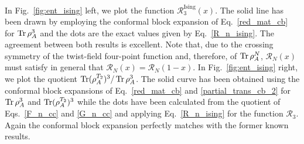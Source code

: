\documentclass[a4paper,11pt]{article}
\def\Tr{\mathop{\mbox{\normalfont Tr}}\nolimits}
\begin{document}
In Fig.~\ref{fig:ent_ising} left, we plot the function $\mathcal{R}_3^{\text{Ising}}(x)$. 
The solid line has been drawn by employing the conformal block expansion of Eq.~\eqref{red_mat_cb} 
for $\Tr\rho_A^3$ and the dots are the exact values given by Eq.~\eqref{R_n_ising}. 
The agreement between both results is excellent. Note that, due to the crossing symmetry of the 
twist-field four-point function and, therefore, of $\Tr\rho_A^N$, $\mathcal{R}_N(x)$ must 
satisfy in general that $\mathcal{R}_N(x)=\mathcal{R}_N(1-x)$.
In Fig.~\ref{fig:ent_ising} right, we plot the quotient $\Tr(\rho_A^{T_2})^3/\Tr\rho_A^3$. 
The solid curve has been obtained using the conformal block expansions of Eq.~\eqref{red_mat_cb} 
and \eqref{partial_trans_cb_2} for $\Tr\rho_A^3$ and $\Tr(\rho_A^{T_2})^3$ while 
the dots have been calculated from the quotient of Eqs.~\eqref{F_n_cc} and \eqref{G_n_cc} 
and applying Eq.~\eqref{R_n_ising} for the function $\mathcal{R}_3$. Again the conformal block
expansion perfectly matches with the former known results.
\end{document}
